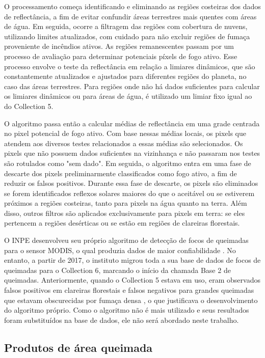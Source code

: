 \documentclass[cic,tc]{iiufrgs}
\begin{document}
O processamento começa identificando e eliminando as regiões costeiras dos dados de reflectância, a fim de evitar confundir áreas terrestres mais quentes com áreas de água. Em seguida, ocorre a filtragem das regiões com cobertura de nuvens, utilizando limites atualizados, com cuidado para não excluir regiões de fumaça proveniente de incêndios ativos. As regiões remanescentes passam por um processo de avaliação para determinar potenciais píxels de fogo ativo. Esse processo envolve o teste da reflectância em relação a limiares dinâmicos, que são constantemente atualizados e ajustados para diferentes regiões do planeta, no caso das áreas terrestres. Para regiões onde não há dados suficientes para calcular os limiares dinâmicos ou para áreas de água, é utilizado um limiar fixo igual ao do Collection 5.

O algoritmo passa então a calcular médias de reflectância em uma grade centrada no pixel potencial de fogo ativo. Com base nessas médias locais, os pixels que atendem aos diversos testes relacionados a essas médias são selecionados. Os pixels que não possuem dados suficientes na vizinhança e não passaram nos testes são rotulados como "sem dado". Em seguida, o algoritmo entra em uma fase de descarte dos pixels preliminarmente classificados como fogo ativo, a fim de reduzir os falsos positivos. Durante essa fase de descarte, os pixels são eliminados se forem identificados reflexos solares maiores do que o aceitável ou se estiverem próximos a regiões costeiras, tanto para pixels na água quanto na terra. Além disso, outros filtros são aplicados exclusivamente para pixels em terra: se eles pertencem a regiões desérticas ou se estão em regiões de clareiras florestais.

O INPE desenvolveu seu próprio algoritmo de detecção de focos de queimadas para o sensor MODIS, o qual produzia dados de maior confiabilidade \citep{PerguntasFrequentesINPE}. No entanto, a partir de 2017, o instituto migrou toda a sua base de dados de focos de queimadas para o Collection 6, marcando o início da chamada Base 2 de queimadas. Anteriormente, quando o Collection 5 estava em uso, eram observados falsos positivos em clareiras florestais e falsos negativos para grandes queimadas que estavam obscurecidas por fumaça densa \citep{SCHROEDER2008}, o que justificava o desenvolvimento do algoritmo próprio. Como o algoritmo não é mais utilizado e seus resultados foram substituídos na base de dados, ele não será abordado neste trabalho.

\subsection*{Produtos de área queimada}
\end{document}
